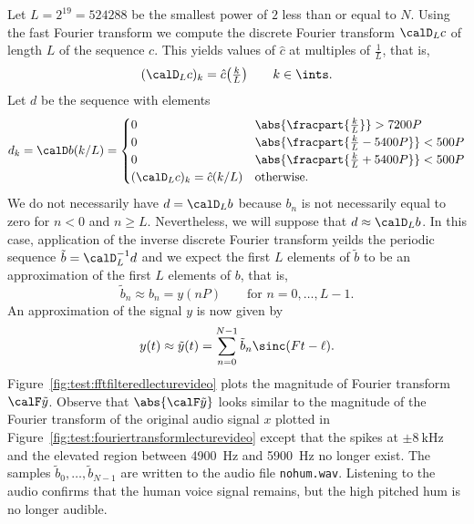 \begin{test}
Let $L = 2^{19} = 524288$ be the smallest power of $2$ less than or equal to $N$. Using the fast Fourier transform we compute the discrete Fourier transform $\calD_L c$ of length $L$ of the sequence $c$.  This yields values of $\hat{c}$ at multiples of $\tfrac{1}{L}$, that is,
\[
(\calD_L c)_k = \hat{c}\big( \tfrac{k}{L} \big) \qquad k \in \ints.
\]
Let $d$ be the sequence with elements 
\[
d_k = \calD b(k/L) = \begin{cases}
0 & \abs{\fracpart{\frac{k}{L}}} > 7200P \\
0 & \abs{\fracpart{\frac{k}{L}-5400P}} < 500P \\
0 & \abs{\fracpart{\frac{k}{L}+5400P}} < 500P \\
(\calD_L c)_k = \hat{c}(k/L) & \text{otherwise}.
\end{cases}
\]
We do not necessarily have $d = \calD_L b$ because $b_n$ is not necessarily equal to zero for $n < 0$ and $n \geq L$.  Nevertheless, we will suppose that $d \approx \calD_L b$.  In this case, application of the inverse discrete Fourier transform yeilds the periodic sequence $\tilde{b} = \calD_L^{-1} d$ and we expect the first $L$ elements of $\tilde{b}$ to be an approximation of the first $L$ elements of $b$, that is, 
\[
\tilde{b}_n \approx b_n = y(nP) \qquad \text{for $n = 0, \dots, L-1$}.
\]  
An approximation of the signal $y$ is now given by
\[
y(t) \approx \tilde{y}(t) = \sum_{n = 0}^{N-1} \tilde{b}_n \sinc(F t - \ell).
\]
Figure~\ref{fig:test:fftfilteredlecturevideo} plots the magnitude of Fourier transform $\calF \tilde{y}$.  Observe that $\abs{\calF \tilde{y}}$ looks similar to the magnitude of the Fourier transform of the original audio signal $x$ plotted in Figure~\ref{fig:test:fouriertransformlecturevideo} except that the spikes at $\pm\SI{8}{\kilo\hertz}$ and the elevated region between \SI{4900}{\hertz} and \SI{5900}{\hertz} no longer exist.  The samples $\tilde{b}_0,\dots,\tilde{b}_{N-1}$ are written to the audio file \texttt{nohum.wav}. Listening to the audio confirms that the human voice signal remains, but the high pitched hum is no longer audible.

\end{test}

